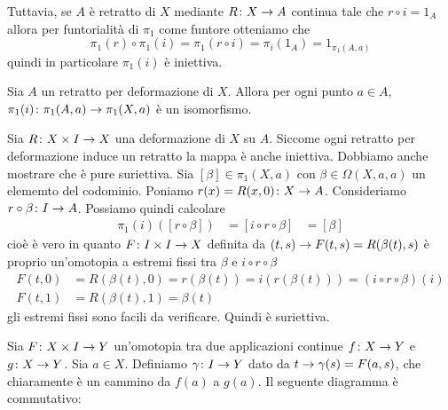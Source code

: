 \documentclass[a4paper]{article}
\begin{document}
Tuttavia, se \(A\) è retratto di \(X\) mediante \(R \colon X \to A\) continua
tale che \(r \circ i = 1_A\) allora per funtorialità di \(\pi_1\) come funtore
otteniamo che \[\pi_1(r) \circ \pi_1(i) = \pi_1(r \circ i) = \pi_i(1_A) = 1_{\pi_1(A, a)}\]
quindi in particolare \(\pi_1(i)\) è iniettiva.

\begin{snippetproposition}{}
    Sia \(A\) un retratto per deformazione di \(X\). Allora per ogni punto \(a \in A\),
    \(\pi_1(i) \colon \pi_1(A, a) \to \pi_1(X, a)\) è un isomorfismo.
\end{snippetproposition}

\begin{snippetproof}{}
    Sia \(R\colon X \times I \to X\) una deformazione di \(X\) su \(A\).
    Siccome ogni retratto per deformazione induce un retratto la mappa è anche iniettiva.
    Dobbiamo anche mostrare che è pure suriettiva.
    Sia \([\beta] \in \pi_1(X, a)\) con \(\beta \in \Omega(X, a, a)\) un elememto del codominio.
    Poniamo \(r(x) = R(x, 0) \colon X \to A\).
    Consideriamo \(r \circ \beta \colon I \to A\).
    Possiamo quindi calcolare
    \begin{align*}
        \pi_1(i)([r \circ \beta])
        &= [i \circ r \circ \beta]
        &= [\beta]
    \end{align*}
    cioè è vero in quanto \(F\colon I \times I \to X\)
    definita da \((t,s) \to F(t,s) = R(\beta(t), s)\)
    è proprio un'omotopia a estremi fissi tra \(\beta\) e \(i \circ r \circ \beta\)
    \begin{align*}
        F(t,0) &= R(\beta(t), 0) = r(\beta(t)) = i(r(\beta(t))) = (i \circ r \circ \beta)(i) \\
        F(t,1) &= R(\beta(t), 1) = \beta(t)
    \end{align*}
    gli estremi fissi sono facili da verificare.
    Quindi è suriettiva.
\end{snippetproof}

\begin{snippetproposition}{}
    Sia \(F \colon X \times I \to Y\) un'omotopia tra due applicazioni continue
    \(f \colon X \to Y\) e \(g \colon X \to Y\). Sia \(a \in X\). Definiamo
    \(\gamma \colon I \to Y\) dato da \(t \to \gamma(s) = F(a, s)\),
    che chiaramente è un cammino da \(f(a)\) a \(g(a)\).
    Il seguente diagramma è commutativo:
\end{snippetproposition}
\end{document}
